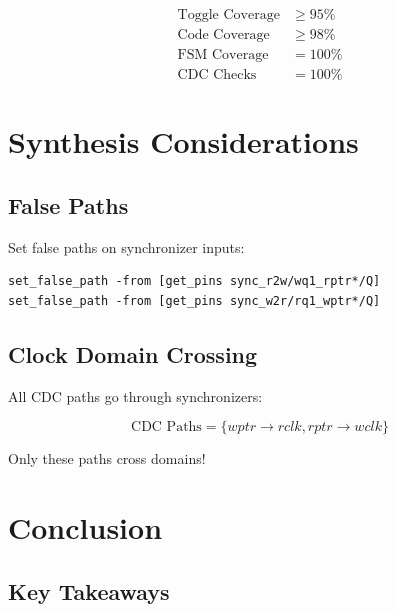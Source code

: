 \documentclass[12pt,a4paper]{article}
\begin{document}
\begin{align}
\text{Toggle Coverage} &\geq 95\% \\
\text{Code Coverage} &\geq 98\% \\
\text{FSM Coverage} &= 100\% \\
\text{CDC Checks} &= 100\%
\end{align}

\section{Synthesis Considerations}

\subsection{False Paths}

Set false paths on synchronizer inputs:

\begin{verbatim}
set_false_path -from [get_pins sync_r2w/wq1_rptr*/Q]
set_false_path -from [get_pins sync_w2r/rq1_wptr*/Q]
\end{verbatim}

\subsection{Clock Domain Crossing}

All CDC paths go through synchronizers:

\begin{equation}
\text{CDC Paths} = \{wptr \rightarrow rclk, rptr \rightarrow wclk\}
\end{equation}

Only these paths cross domains!

\section{Conclusion}

\subsection{Key Takeaways}
\end{document}
